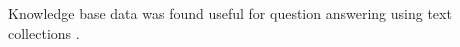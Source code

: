 
Knowledge base data was found useful for question answering using text collections \cite{Sun:2015:ODQ:2736277.2741651}.